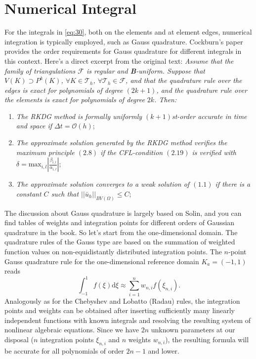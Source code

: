 \documentclass{develop-note}
\begin{document}
\section{Numerical Integral}

For the integrals in \autoref{eq:30}, both on the elements and at element edges, numerical integration is typically employed, such as Gauss quadrature. Cockburn's paper\cite{cockburnRungeKuttaLocalProjection1990} provides the order requirements for Gauss quadrature for different integrals in this context. Here's a direct excerpt from the original text: \textit{Assume that the family of triangulations $\mathscr{F}$ is regular and \textbf{B}-uniform. Suppose that $V(K)\supset P^{k}(K)$, $\forall K\in\mathscr{T}_{h}$, $\forall\mathscr{T}_{h}\in\mathscr{F}$, and that the quadrature rule over the edges is exact for polynomials of degree $(2k +1)$, and the quadrature rule over the elements is exact for polynomials of degree $2k$. Then:}
\begin{enumerate}
  \item \textit{The RKDG method is formally uniformly $(k+1)$st-order accurate in time and space if $\Delta t=\mathcal{O}(h)$};
  \item \textit{The approximate solution generated by the RKDG method verifies the maximum principle $(2.8)$ if the CFL-condition $(2.19)$ is verified with $\delta=\mathrm{max}_{i,l}\left|\frac{\beta_{i,l}}{\alpha_{i,l}}\right|$};
  \item \textit{The approximate solution converges to a weak solution of $(1.1)$ if there is a constant $C$ such that $||\bar{u}_{h}||_{BV(\Omega)}\le C$};
\end{enumerate}

The discussion about Gauss quadrature is largely based on Solin\cite{solinHigherOrderFiniteElement2003}, and you can find tables of weights and integration points for different orders of Gaussian quadrature in the book. So let's start from the one-dimensional domain. The quadrature rules of the Gauss type are based on the summation of weighted function values on non-equidistantly distributed integration points. The $n$-point Gauss quadrature rule for the one-dimensional reference domain $K_{a}=(-1,1)$ reads
\begin{equation}
  \int_{-1}^{1}f(\xi)\mathrm{d}\xi\approx\sum_{i=1}^{n}w_{n,i}f(\xi_{n,i}).
\end{equation}
Analogously as for the Chebyshev and Lobatto (Radau) rules, the integration points and weights can be obtained after inserting sufficiently many linearly independent functions with known integrals and resolving the resulting system of nonlinear algebraic equations. Since we have $2n$ unknown parameters at our disposal ($n$ integration points $\xi_{n,i}$ and $n$ weights $w_{n,i}$), the resulting formula will be accurate for all polynomials of order $2n-1$ and lower.
\end{document}
